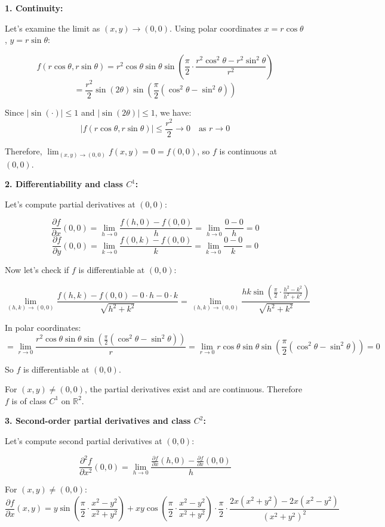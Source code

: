 \documentclass[12pt]{article}
\begin{document}
\begin{correctionbox}
\textbf{1. Continuity:}

Let's examine the limit as $(x,y) \to (0,0)$. Using polar coordinates $x = r\cos\theta$, $y = r\sin\theta$:

$$f(r\cos\theta, r\sin\theta) = r^2\cos\theta\sin\theta \sin\left(\frac{\pi}{2} \cdot \frac{r^2\cos^2\theta - r^2\sin^2\theta}{r^2}\right)$$
$$= \frac{r^2}{2}\sin(2\theta) \sin\left(\frac{\pi}{2}(\cos^2\theta - \sin^2\theta)\right)$$

Since $|\sin(\cdot)| \leq 1$ and $|\sin(2\theta)| \leq 1$, we have:
$$|f(r\cos\theta, r\sin\theta)| \leq \frac{r^2}{2} \to 0 \quad \text{as } r \to 0$$

Therefore, $\lim_{(x,y)\to(0,0)} f(x,y) = 0 = f(0,0)$, so $f$ is continuous at $(0,0)$.

\textbf{2. Differentiability and class $C^1$:}

Let's compute partial derivatives at $(0,0)$:

$$\frac{\partial f}{\partial x}(0,0) = \lim_{h\to 0} \frac{f(h,0) - f(0,0)}{h} = \lim_{h\to 0} \frac{0 - 0}{h} = 0$$
$$\frac{\partial f}{\partial y}(0,0) = \lim_{k\to 0} \frac{f(0,k) - f(0,0)}{k} = \lim_{k\to 0} \frac{0 - 0}{k} = 0$$

Now let's check if $f$ is differentiable at $(0,0)$:

$$\lim_{(h,k)\to(0,0)} \frac{f(h,k) - f(0,0) - 0\cdot h - 0\cdot k}{\sqrt{h^2 + k^2}} = \lim_{(h,k)\to(0,0)} \frac{hk \sin\left(\frac{\pi}{2} \cdot \frac{h^2 - k^2}{h^2 + k^2}\right)}{\sqrt{h^2 + k^2}}$$

In polar coordinates:
$$= \lim_{r\to 0} \frac{r^2\cos\theta\sin\theta \sin\left(\frac{\pi}{2}(\cos^2\theta - \sin^2\theta)\right)}{r} = \lim_{r\to 0} r\cos\theta\sin\theta \sin\left(\frac{\pi}{2}(\cos^2\theta - \sin^2\theta)\right) = 0$$

So $f$ is differentiable at $(0,0)$.

For $(x,y) \neq (0,0)$, the partial derivatives exist and are continuous. Therefore $f$ is of class $C^1$ on $\mathbb{R}^2$.

\textbf{3. Second-order partial derivatives and class $C^2$:}

Let's compute second partial derivatives at $(0,0)$:

$$\frac{\partial^2 f}{\partial x^2}(0,0) = \lim_{h\to 0} \frac{\frac{\partial f}{\partial x}(h,0) - \frac{\partial f}{\partial x}(0,0)}{h}$$

For $(x,y) \neq (0,0)$:
$$\frac{\partial f}{\partial x}(x,y) = y\sin\left(\frac{\pi}{2} \cdot \frac{x^2 - y^2}{x^2 + y^2}\right) + xy\cos\left(\frac{\pi}{2} \cdot \frac{x^2 - y^2}{x^2 + y^2}\right) \cdot \frac{\pi}{2} \cdot \frac{2x(x^2 + y^2) - 2x(x^2 - y^2)}{(x^2 + y^2)^2}$$


\end{correctionbox}
\end{document}
